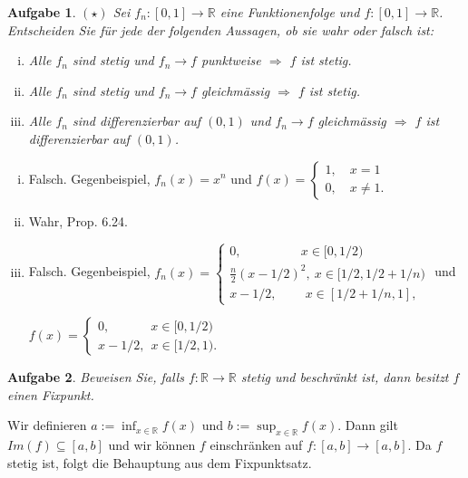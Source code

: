 \documentclass[a4paper, 20]{exam}
\newtheorem{ex}{Aufgabe}
\newcommand\RR{\mathbb{R}}
\begin{document}
\begin{ex}{$(\star)$}
Sei $f_n:[0,1] \longrightarrow \RR$ eine Funktionenfolge und $f:[0,1] \longrightarrow \RR$. Entscheiden Sie f\"ur jede der folgenden Aussagen, ob sie wahr oder falsch ist:
\begin{enumerate}[i.)]
\item
Alle $f_n$ sind stetig und $f_n \longrightarrow f$ punktweise $\Longrightarrow$ $f$ ist stetig. 
\item
Alle $f_n$ sind stetig und $f_n \longrightarrow f$ gleichm\"assig $\Longrightarrow$ $f$ ist stetig. 
\item
Alle $f_n$ sind differenzierbar auf $(0,1)$ und $f_n \longrightarrow f$ gleichm\"assig $\Longrightarrow$ $f$ ist differenzierbar auf $(0,1)$. 
\end{enumerate}
\end{ex}
\begin{solution}
\begin{enumerate}[i.)]
\item
Falsch. Gegenbeispiel, $f_n(x)=x^n$ und $f(x)=\begin{cases} 1, \quad x=1 \\ 0,\quad x \neq 1. \end{cases}$
\item
Wahr, Prop. 6.24.
\item
Falsch. Gegenbeispiel, $f_n(x)=\begin{cases} 0, \qquad \qquad \ \ \ x\in [0, 1/2) \\ \frac{n}{2}(x-1/2)^2 , \ x\in [1/2, 1/2+1/n) \\ x-1/2, \quad \quad \ x\in [1/2+1/n, 1], \end{cases}$
und 

$f(x)= \begin{cases} 0,  \qquad \quad \ x\in [0, 1/2) \\ x-1/2 , \ \ x\in [1/2, 1). \end{cases}$
\end{enumerate}
\end{solution}





\begin{ex}
Beweisen Sie, falls $f:\RR \longrightarrow \RR$ stetig und beschr\"ankt ist, dann besitzt $f$ einen Fixpunkt.
\end{ex}
\begin{solution}
Wir definieren $a:=\inf_{x\in \RR} f(x)$ und $b:=\sup_{x\in \RR} f(x)$. Dann gilt $Im(f) \subseteq [a,b]$ und wir k\"onnen $f$ einschr\"anken auf $f:[a,b] \longrightarrow [a,b]$. Da $f$ stetig ist, folgt die Behauptung aus dem Fixpunktsatz.
\end{solution}
\end{document}
